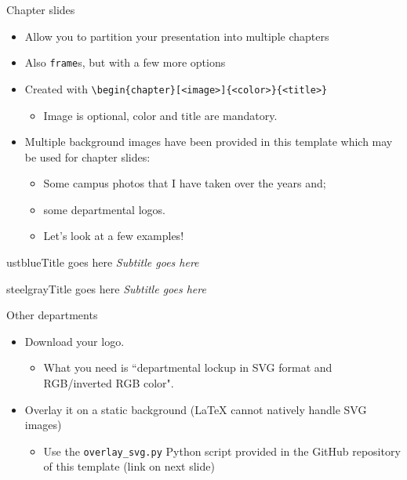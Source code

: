 \documentclass[]{beamer}
\begin{document}
\begin{frame}[fragile]{Chapter slides}
\begin{itemize}
\item Allow you to partition your presentation into multiple chapters
\item Also \verb|frame|s, but with a few more options
\item Created with \verb|\begin{chapter}[<image>]{<color>}{<title>}|
  \begin{itemize}
  \item Image is optional, color and title are mandatory.
  \end{itemize}
\item Multiple background images have been provided in this template which may be used for chapter slides:
  \begin{itemize}
  \item Some campus photos that I have taken over the years and;
  \item some departmental logos.
  \item Let's look at a few examples!
  \end{itemize}
\end{itemize}
\end{frame}


\begin{chapter}{ustblue}{Title goes here}
\textit{Subtitle goes here}
\end{chapter}


\begin{chapter}{steelgray}{Title goes here}
\textit{Subtitle goes here}
\end{chapter}

\begin{frame}[fragile]{Other departments}
\begin{itemize}
\item Download your logo.
    \begin{itemize}
    \item What you need is ``departmental lockup in SVG format and RGB/inverted RGB color".
    \end{itemize}
\item Overlay it on a static background (LaTeX cannot natively handle SVG images)
    \begin{itemize}
    \item Use the \verb|overlay_svg.py| Python script provided in the GitHub repository of this template (link on next slide)
    \end{itemize}
\end{itemize}
\end{frame}
\end{document}
